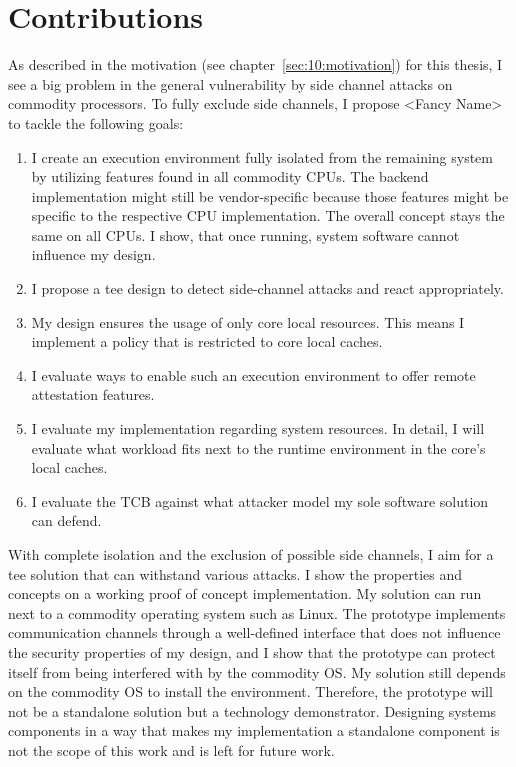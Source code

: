 \section{Contributions}
\label{sec:10:contributions}
As described in the motivation (see chapter~\ref{sec:10:motivation}) for this
thesis, I see a big problem in the general vulnerability by side channel
attacks on commodity processors. To fully exclude side channels, I propose
<Fancy Name> to tackle the following
goals:

\begin{enumerate}
    \item I create an execution environment fully isolated from the remaining
          system by utilizing features found in all commodity CPUs. The backend
          implementation might still be vendor-specific because those features
          might be specific to the respective CPU implementation. The overall
          concept stays the same on all CPUs. I show, that once running, system
          software cannot influence my design.
    \item I propose a \gls{tee} design to detect side-channel attacks and react
          appropriately.
    \item My design ensures the usage of only core local resources. This means
          I implement a policy that is restricted to core local caches.
    \item I evaluate ways to enable such an execution environment to offer
          remote attestation features.
    \item I evaluate my implementation regarding system resources. In detail,
          I will evaluate what workload fits next to the runtime
          environment in the core's local caches.
    \item I evaluate the TCB against what attacker model my sole software
          solution can defend.
\end{enumerate}

With complete isolation and the exclusion of possible side channels, I aim for a
\gls{tee} solution that can withstand various attacks. I show the properties and
concepts on a working proof of concept implementation. My solution can run next
to a commodity operating system such as Linux. The prototype implements
communication channels through a well-defined interface that does not influence
the security properties of my design, and I show that the prototype can protect
itself from being interfered with by the commodity OS. My solution still depends
on the commodity OS to install the environment. Therefore, the prototype will
not be a standalone solution but a technology demonstrator. Designing systems
components in a way that makes my implementation a standalone component is not
the scope of this work and is left for future work.
